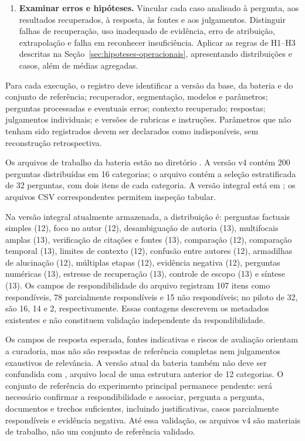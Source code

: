 \begin{enumerate}
  \item \textbf{Examinar erros e hipóteses.} Vincular cada caso analisado à pergunta, aos resultados recuperados, à resposta, às fontes e aos julgamentos. Distinguir falhas de recuperação, uso inadequado de evidência, erro de atribuição, extrapolação e falha em reconhecer insuficiência. Aplicar as regras de H1--H3 descritas na Seção~\ref{sec:hipoteses-operacionais}, apresentando distribuições e casos, além de médias agregadas.
\end{enumerate}

Para cada execução, o registro deve identificar a versão da base, da bateria e do conjunto de referência; recuperador, segmentação, modelos e parâmetros; perguntas processadas e eventuais erros; contexto recuperado; respostas; julgamentos individuais; e versões de rubricas e instruções. Parâmetros que não tenham sido registrados devem ser declarados como indisponíveis, sem reconstrução retrospectiva.


Os arquivos de trabalho da bateria estão no diretório . A versão v4 contém 200 perguntas distribuídas em 16 categorias; o arquivo  contém a seleção estratificada de 32 perguntas, com dois itens de cada categoria. A versão integral está em ; os arquivos CSV correspondentes permitem inspeção tabular.

Na versão integral atualmente armazenada, a distribuição é: perguntas factuais simples (12), foco no autor (12), desambiguação de autoria (13), multifocais amplas (13), verificação de citações e fontes (13), comparação (12), comparação temporal (13), limites de contexto (12), confusão entre autores (12), armadilhas de alucinação (12), múltiplas etapas (12), evidência negativa (12), perguntas numéricas (13), estresse de recuperação (13), controle de escopo (13) e síntese (13). Os campos de respondibilidade do arquivo registram 107 itens como respondíveis, 78 parcialmente respondíveis e 15 não respondíveis; no piloto de 32, são 16, 14 e 2, respectivamente. Essas contagens descrevem os metadados existentes e não constituem validação independente da respondibilidade.

Os campos de resposta esperada, fontes indicativas e riscos de avaliação orientam a curadoria, mas não são respostas de referência completas nem julgamentos exaustivos de relevância. A versão atual da bateria também não deve ser confundida com , arquivo local de uma estrutura anterior de 12 categorias. O conjunto de referência do experimento principal permanece pendente: será necessário confirmar a respondibilidade e associar, pergunta a pergunta, documentos e trechos suficientes, incluindo justificativas, casos parcialmente respondíveis e evidência negativa. Até essa validação, os arquivos v4 são materiais de trabalho, não um conjunto de referência validado.

